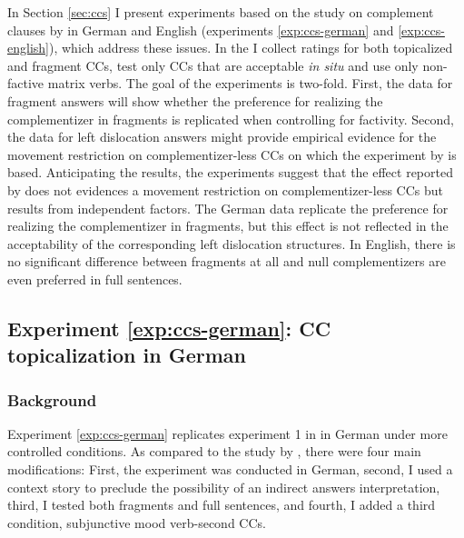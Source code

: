 \noindent In Section \ref{sec:ccs} I present experiments based on the study on complement clauses by \citet{merchant.etal2013} in German and English (experiments \ref{exp:ccs-german} and \ref{exp:ccs-english}), which address these issues. In the I collect ratings for both topicalized and fragment CCs, test only CCs that are acceptable \textit{in situ} and use only non-factive matrix verbs. The goal of the experiments is two-fold. First, the data for fragment answers will show whether the preference for realizing the complementizer in fragments is replicated when controlling for factivity. Second, the data for left dislocation answers might provide empirical evidence for the movement restriction on complementizer-less CCs on which the experiment by \citet{merchant.etal2013} is based. Anticipating the results, the experiments suggest that the effect reported by \citet{merchant.etal2013} does not evidences a movement restriction on complementizer-less CCs but results from independent factors. The German data replicate the preference for realizing the complementizer in fragments, but this effect is not reflected in the acceptability of the corresponding left dislocation structures. In English, there is no significant difference between fragments at all and null complementizers are even preferred in full sentences.

\label{exp:ccs-german}
\subsection{Experiment \ref{exp:ccs-german}: CC topicalization in German} 
\label{sec:ccs-german}

\subsubsection{Background}\label{sec:ccs-german-background}
Experiment \ref{exp:ccs-german} replicates experiment 1 in \citet{merchant.etal2013} in German under more controlled conditions. As compared to the study by \citet{merchant.etal2013}, there were four main modifications: First, the experiment was conducted in German, second, I used a context story to preclude the possibility of an indirect answers interpretation, third, I tested both fragments and full sentences, and fourth, I added a third condition, subjunctive mood verb-second CCs.

